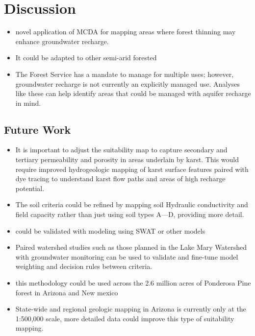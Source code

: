 \documentclass[
  number,
  preprint,
  3p,
  onecolumn]{elsarticle}
\begin{document}
\section{Discussion}\label{discussion}

\begin{itemize}
\item
  novel application of MCDA for mapping areas where forest thinning may
  enhance groundwater recharge.
\item
  It could be adapted to other semi-arid forested
\item
  The Forest Service has a mandate to manage for multiple uses; however,
  groundwater recharge is not currently an explicitly managed use.
  Analyses like these can help identify areas that could be managed with
  aquifer recharge in mind.
\end{itemize}

\subsection{Future Work}\label{future-work}

\begin{itemize}
\item
  It is important to adjust the suitability map to capture secondary and
  tertiary permeability and porosity in areas underlain by karst. This
  would require improved hydrogeologic mapping of karst surface features
  paired with dye tracing to understand karst flow paths and areas of
  high recharge potential.
\item
  The soil criteria could be refined by mapping soil Hydraulic
  conductivity and field capacity rather than just using soil types
  A---D, providing more detail.
\item
  could be validated with modeling using SWAT or other models
\item
  Paired watershed studies such as those planned in the Lake Mary
  Watershed with groundwater monitoring can be used to validate and
  fine-tune model weighting and decision rules between criteria.
\item
  this methodology could be used across the 2.6 million acres of
  Ponderosa Pine forest in Arizona and New mexico
\item
  State-wide and regional geologic mapping in Arizona is currently only
  at the 1:500,000 scale, more detailed data could improve this type of
  suitability mapping.
\end{itemize}
\end{document}
